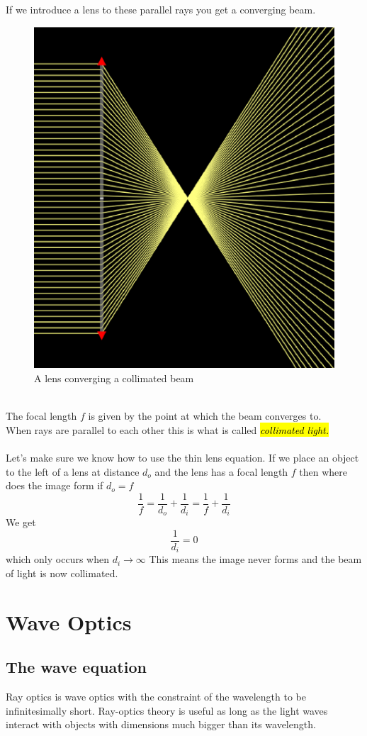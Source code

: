 \documentclass{article}
\begin{document}
\newpage

If we introduce a lens to these parallel rays you get a converging beam.
\begin{figure}[!phtb]
    \centering
    \includegraphics[width=0.5\linewidth]{img/Converging.eps}
    \caption{A lens converging a collimated beam}
    \label{fig:PointSource}
\end{figure}
\\
The focal length $f$ is given by the point at which the beam converges to.
\\
When rays are parallel to each other this is what is called \hl{\emph{collimated light.}}
\\
\\
Let's make sure we know how to use the thin lens equation.
If we place an object to the left of a lens at distance $d_o$ and the lens has a focal length $f$ then where does the image form if $d_o = f$
$$\frac{1}{f} = \frac{1}{d_o}+\frac{1}{d_i}= \frac{1}{f}+\frac{1}{d_i}$$
We get $$\frac{1}{d_i} = 0$$ which only occurs when $d_i \rightarrow \infty$
This means the image never forms and the beam of light is now collimated.

\section{Wave Optics}
\subsection{The wave equation}
Ray optics is wave optics with the constraint of the wavelength to be infinitesimally short. Ray-optics theory is useful as long as the light waves interact with objects with dimensions much bigger than its wavelength.
\end{document}
